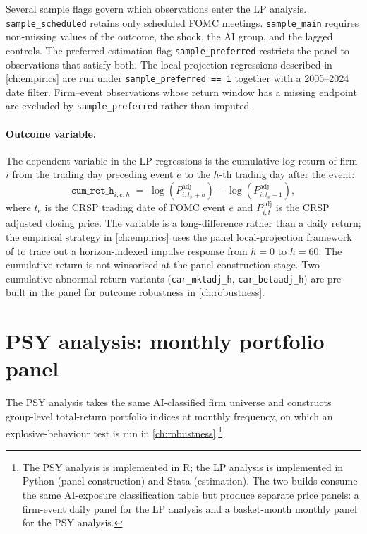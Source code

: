 Several sample flags govern which observations enter the LP analysis. \texttt{sample\_scheduled} retains only scheduled FOMC meetings. \texttt{sample\_main} requires non-missing values of the outcome, the shock, the AI group, and the lagged controls. The preferred estimation flag \texttt{sample\_preferred} restricts the panel to observations that satisfy both. The local-projection regressions described in \cref{ch:empirics} are run under \texttt{sample\_preferred == 1} together with a 2005--2024 date filter. Firm--event observations whose return window has a missing endpoint are excluded by \texttt{sample\_preferred} rather than imputed.

\paragraph{Outcome variable.} The dependent variable in the LP regressions is the cumulative log return of firm $i$ from the trading day preceding event $e$ to the $h$-th trading day after the event:
\begin{equation}
    \texttt{cum\_ret\_h}_{i,e,h} \;=\; \log\!\left(P^{\text{adj}}_{i,t_e+h}\right) - \log\!\left(P^{\text{adj}}_{i,t_e-1}\right),
    \label{eq:cum-ret}
\end{equation}
where $t_e$ is the CRSP trading date of FOMC event $e$ and $P^{\text{adj}}_{i,t}$ is the CRSP adjusted closing price. The variable is a long-difference rather than a daily return; the empirical strategy in \cref{ch:empirics} uses the panel local-projection framework of \citet{jorda2005} to trace out a horizon-indexed impulse response from $h=0$ to $h=60$. The cumulative return is not winsorised at the panel-construction stage. Two cumulative-abnormal-return variants (\texttt{car\_mktadj\_h}, \texttt{car\_betaadj\_h}) are pre-built in the panel for outcome robustness in \cref{ch:robustness}.

\section{PSY analysis: monthly portfolio panel}
\label{sec:psy-data}

The PSY analysis takes the same AI-classified firm universe and constructs group-level total-return portfolio indices at monthly frequency, on which an explosive-behaviour test is run in \cref{ch:robustness}.\footnote{The PSY analysis is implemented in R; the LP analysis is implemented in Python (panel construction) and Stata (estimation). The two builds consume the same AI-exposure classification table but produce separate price panels: a firm-event daily panel for the LP analysis and a basket-month monthly panel for the PSY analysis.}

